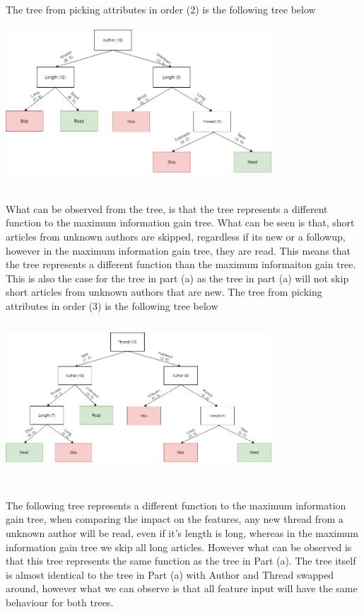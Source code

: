 \documentclass{article}
\begin{document}
\begin{enumerate}[(a)]
\newpage
The tree from picking attributes in order (2) is the following tree below
\begin{center}
\hspace*{-1cm}
\includegraphics[width=376px,height=210px]{tree4.png}
\end{center}\\
What can be observed from the tree, is that the tree represents a different function to the maximum information gain tree. What can be seen is that, short articles from unknown authors are skipped, regardless if its new or a followup, however in the maximum information gain tree, they are read. This means that the tree represents a different function than the maximum informaiton gain tree. This is also the case for the tree in part (a) as the tree in part (a) will not skip short articles from unknown authors that are new.\newpage
The tree from picking attributes in order (3) is the following tree below
\begin{center}
\hspace*{-1cm}
\includegraphics[width=376px,height=210px]{tree5.png}
\end{center}\\
The following tree represents a different function to the  maximum information gain tree, when comparing the impact on the features, any new thread from a unknown author will be read, even if it's length is long, whereas in the maximum information gain tree we skip all long articles. However what can be observed is that this tree represents the same function as the tree in Part (a). The tree itself is almost identical to the tree in Part (a) with Author and Thread swapped around, however what we can observe is that all feature input will have the same behaviour for both trees.


\end{enumerate}
\end{document}
